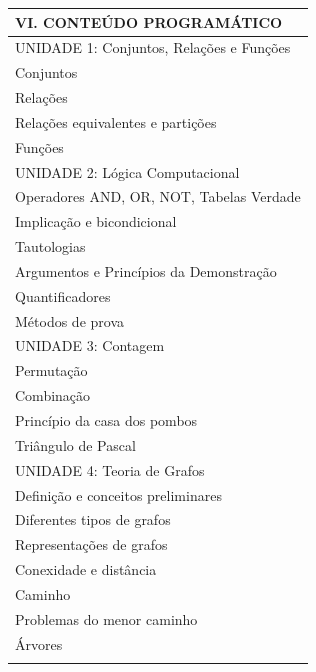 \documentclass[12pt]{article}
\begin{document}
\begin{longtable}{|L{1.025\textwidth}|} \hline
%
{\bf VI. CONTEÚDO PROGRAMÁTICO } \\ \hline

UNIDADE 1: Conjuntos, Relações e Funções \\

Conjuntos\\
Relações\\
Relações equivalentes e partições\\
Funções\\

UNIDADE 2: Lógica Computacional \\

Operadores AND, OR, NOT, Tabelas Verdade\\
Implicação e bicondicional\\
Tautologias\\
Argumentos e Princípios da Demonstração\\
Quantificadores \\
Métodos de prova\\

UNIDADE 3: Contagem \\

Permutação\\
Combinação\\
Princípio da casa dos pombos\\
Triângulo de Pascal\\

UNIDADE 4: Teoria de Grafos \\

Definição e conceitos preliminares\\
Diferentes tipos de grafos\\
Representações de grafos\\
Conexidade e distância\\
Caminho\\
Problemas do menor caminho\\
Árvores\\

\\ \hline
\end{longtable} 
\end{document}

